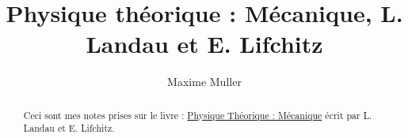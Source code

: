 \documentclass[a4paper]{report}
\author{Maxime Muller}
\title{Physique théorique : Mécanique, L. Landau et E. Lifchitz}
\begin{document}
\maketitle

\begin{abstract}
    Ceci sont mes notes prises sur le livre : \underline{Physique Théorique : Mécanique} écrit par L. Landau et E. Lifchitz.
\end{abstract}

\newpage

\tableofcontents

\newpage

\end{document}
